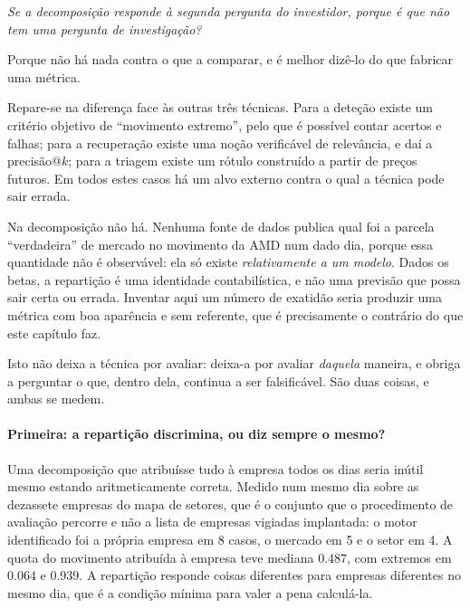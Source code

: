 \emph{Se a decomposição responde à segunda pergunta do investidor, porque é que não tem uma pergunta
de investigação?}

Porque não há nada contra o que a comparar, e é melhor dizê-lo do que fabricar uma métrica.

Repare-se na diferença face às outras três técnicas. Para a deteção existe um critério objetivo de
``movimento extremo'', pelo que é possível contar acertos e falhas; para a recuperação existe uma
noção verificável de relevância, e daí a precisão@$k$; para a triagem existe um rótulo construído a
partir de preços futuros. Em todos estes casos há um alvo externo contra o qual a técnica pode
sair errada.

Na decomposição não há. Nenhuma fonte de dados publica qual foi a parcela ``verdadeira'' de mercado
no movimento da AMD num dado dia, porque essa quantidade não é observável: ela só existe
\emph{relativamente a um modelo}. Dados os betas, a repartição é uma identidade contabilística, e não
uma previsão que possa sair certa ou errada. Inventar aqui um número de exatidão seria produzir uma
métrica com boa aparência e sem referente, que é precisamente o contrário do que este capítulo faz.

Isto não deixa a técnica por avaliar: deixa-a por avaliar \emph{daquela} maneira, e obriga a
perguntar o que, dentro dela, continua a ser falsificável. São duas coisas, e ambas se medem.

\paragraph{Primeira: a repartição discrimina, ou diz sempre o mesmo?}
Uma decomposição que atribuísse tudo à empresa todos os dias seria inútil mesmo estando
aritmeticamente correta. Medido num mesmo dia sobre as dezassete empresas do mapa de setores, que é o conjunto que o procedimento de avaliação percorre e não a lista de empresas vigiadas implantada: o motor identificado foi a
própria empresa em 8 casos, o mercado em 5 e o setor em 4. A quota do movimento atribuída à empresa
teve mediana $0.487$, com extremos em $0.064$ e $0.939$. A repartição responde coisas diferentes para
empresas diferentes no mesmo dia, que é a condição mínima para valer a pena calculá-la.

